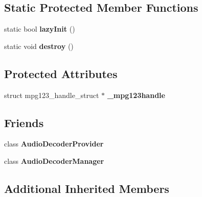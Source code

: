 \subsection*{Static Protected Member Functions}
\begin{DoxyCompactItemize}
\item 
\mbox{\label{classcocos2d_1_1experimental_1_1AudioDecoderMp3_aeb0f60d5f339213d0d96e982fd8d9c81}} 
static bool {\bfseries lazy\+Init} ()
\item 
\mbox{\label{classcocos2d_1_1experimental_1_1AudioDecoderMp3_a94d16f68b3fc40c5c6965dd7a5d37cf0}} 
static void {\bfseries destroy} ()
\end{DoxyCompactItemize}
\subsection*{Protected Attributes}
\begin{DoxyCompactItemize}
\item 
\mbox{\label{classcocos2d_1_1experimental_1_1AudioDecoderMp3_a844a04e310285939224051031416139f}} 
struct mpg123\+\_\+handle\+\_\+struct $\ast$ {\bfseries \+\_\+mpg123handle}
\end{DoxyCompactItemize}
\subsection*{Friends}
\begin{DoxyCompactItemize}
\item 
\mbox{\label{classcocos2d_1_1experimental_1_1AudioDecoderMp3_afb46984384ce8b9caa8516e0a84944ef}} 
class {\bfseries Audio\+Decoder\+Provider}
\item 
\mbox{\label{classcocos2d_1_1experimental_1_1AudioDecoderMp3_af7bd9270f880d1dc12f5f54d21b08711}} 
class {\bfseries Audio\+Decoder\+Manager}
\end{DoxyCompactItemize}
\subsection*{Additional Inherited Members}


